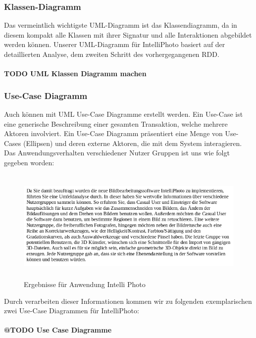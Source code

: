 \documentclass[11pt,a4paper]{article}
\begin{document}
\subsubsection{Klassen-Diagramm}
Das vermeintlich wichtigste UML-Diagramm ist das Klassendiagramm, da in diesem kompakt alle Klassen mit ihrer Signatur und alle Interaktionen abgebildet werden können. Unserer UML-Diagramm für IntelliPhoto basiert auf der detaillierten Analyse, dem zweiten Schritt des vorhergegangenen RDD.\\
\\
\textbf{TODO UML Klassen Diagramm machen}
\\

\subsubsection{Use-Case Diagramm}
Auch können mit UML Use-Case Diagramme erstellt werden. Ein Use-Case ist eine generische
Beschreibung einer gesamten Transaktion, welche mehrere Aktoren involviert. Ein Use-Case Diagramm präsentiert eine Menge von Use-Cases (Ellipsen) und deren externe Aktoren, die mit dem System interagieren. Das Anwendungsverhalten verschiedener Nutzer Gruppen ist uns wie folgt gegeben worden:
\begin{figure}[H]
  \centering
  \includegraphics[width=\textwidth, height=5.5cm, frame]{usecaseanalyse.png}
	\caption{Ergebnisse für Anwendung Intelli Photo}
	\label{fig1}
\end{figure}
\noindent
Durch verarbeiten dieser Informationen kommen wir zu folgenden exemplarischen zwei Use-Case Diagrammen für IntelliPhoto:\\
\\
\textbf{@TODO Use Case Diagramme}
\\
\end{document}
